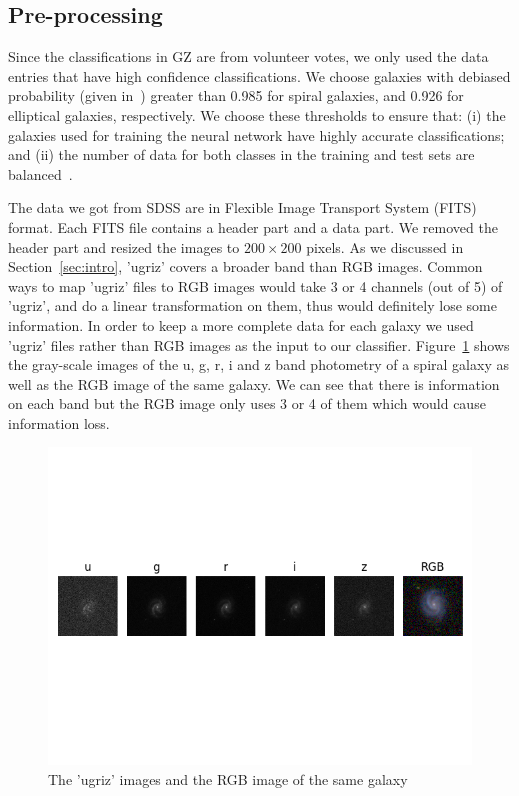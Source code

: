\subsection{Pre-processing}
Since the classifications in GZ are from volunteer votes, we only used the data entries that
have high confidence classifications. We choose galaxies with debiased probability (given in~\cite{lintott2010galaxy}) greater than 0.985 for spiral galaxies, and 0.926 for elliptical galaxies, respectively. 
We choose these thresholds to ensure that: (i) the galaxies used for training the neural network have highly accurate classifications; and (ii) the number of data for both classes in the training and test sets are balanced~\cite{khan2019deep}. 

The data we got from SDSS are in Flexible Image Transport System (FITS) format. 
Each FITS file contains a header part and a data part. We removed the header part and resized the images to $200 \times 200$ pixels. As we discussed in Section~\ref{sec:intro}, 'ugriz' covers a broader band than RGB images. Common ways to map 'ugriz' files to RGB images would take 3 or 4 channels (out of 5) of 'ugriz', and do a linear transformation on them, thus would definitely lose some information. 
In order to keep a more complete data for each galaxy we used 'ugriz' files rather than RGB images as the input to our classifier. Figure~\ref{fig:ugriz} shows the gray-scale images of the u, g, r, i and z band photometry of a spiral galaxy as well as the RGB image of the same galaxy. We can see that there is information on each band but the RGB image only uses 3 or 4 of them which would cause information loss.

\begin{figure}[h]
	\centering
	\captionsetup{justification=centering}
	\includegraphics[trim={0 4cm 0 4cm},clip]{Figures/ugriz_vs_rgb.png}
	\caption{The 'ugriz' images and the RGB image of the same galaxy}
	\label{fig:ugriz}
\end{figure}

